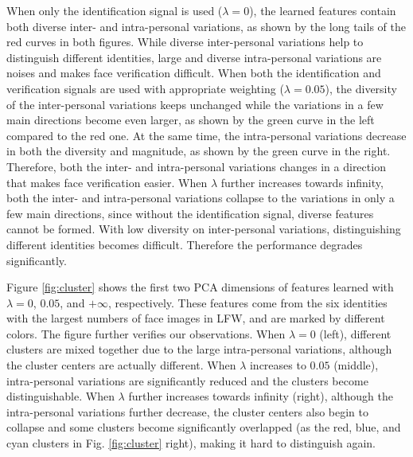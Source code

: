 \documentclass{article} %
\begin{document}
When only the identification signal is used ($\lambda=0$), the learned features contain both diverse inter- and intra-personal variations, as shown by the long tails of the red curves in both figures. While diverse inter-personal variations help to distinguish different identities, large and diverse intra-personal variations are noises and makes face verification difficult. When both the identification and verification signals are used with appropriate weighting ($\lambda=0.05$), the diversity of the inter-personal variations keeps unchanged while the variations in a few main directions become even larger, as shown by the green curve in the left compared to the red one. At the same time, the intra-personal variations decrease in both the diversity and magnitude, as shown by the green curve in the right. Therefore, both the inter- and intra-personal variations changes in a direction that makes face verification easier. When $\lambda$ further increases towards infinity, both the inter- and intra-personal variations collapse to the variations in only a few main directions, since without the identification signal, diverse features cannot be formed. With low diversity on inter-personal variations, distinguishing different identities becomes difficult. Therefore the performance degrades significantly.

Figure \ref{fig:cluster} shows the first two PCA dimensions of features learned with $\lambda=0$, $0.05$, and $+\infty$, respectively. These features come from the six identities with the largest numbers of face images in LFW, and are marked by different colors. The figure further verifies our observations. When $\lambda=0$ (left), different clusters are mixed together due to the large intra-personal variations, although the cluster centers are actually different. When $\lambda$ increases to $0.05$ (middle), intra-personal variations are significantly reduced and the clusters become distinguishable. When $\lambda$ further increases towards infinity (right), although the intra-personal variations further decrease, the cluster centers also begin to collapse and some clusters become significantly overlapped (as the red, blue, and cyan clusters in Fig. \ref{fig:cluster} right), making it hard to distinguish again.
\end{document}

